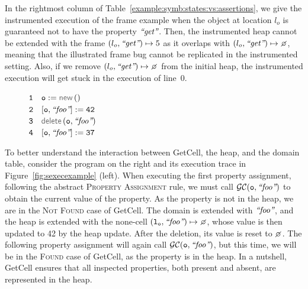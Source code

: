  
 
 In the rightmost column of Table~\ref{example:symb:states:vs:assertions}, we give the instrumented 
 execution of the frame example when
 the object at location $l_o$ is guaranteed not to have the property $\text{{\it ``get''}}$. 
 Then, the  instrumented heap cannot be extended  with 
 the frame $(l_o, \text{{\it ``get''}}) \mapsto 5$ as it overlaps with $(\loc_o, \litstring{get}) \mapsto \none$, meaning 
 that the illustrated frame bug cannot be replicated in the instrumented setting.  
 Also, if we remove $(\loc_o, \litstring{get}) \mapsto \none$ from the initial heap, 
 the instrumented execution will get stuck in the execution of line~$0$. 

\begin{figure}
\vspace*{-0.3cm}
{\footnotesize
\hspace*{-0.5cm} $\mathtt{1\quad o := \jsilnew ()}$ \\[-0.06cm]
\hspace*{-0.5cm} $\mathtt{2\quad [o, \text{{\it ``foo''}}] := 42}$ \\[-0.06cm]
\hspace*{-0.5cm} $\mathtt{3\quad \jsildelete(o, \litstring{foo})}$ \\ [-0.06cm]
\hspace*{-0.5cm} $\mathtt{4\quad [o, \text{{\it ``foo''}}] := 37}$ 
}
\vspace*{-0.4cm}
\end{figure}

To better understand the interaction between GetCell, the heap, and the domain table, consider the 
 program on the right and its execution trace in Figure~\ref{fig:sexecexample} (left). When executing the first property assignment, following the abstract \textsc{Property Assignment} rule, we must call $\mathcal{GC}(\mathtt{o, \text{{\it ``foo''}}})$ to obtain the current value of the property. As the property is not in the heap, we are in the \textsc{Not Found} case of GetCell. The domain is extended with $\text{{\it ``foo''}}$, and the heap is extended with the none-cell $\mathtt{(\loc_o, \litstring{foo})} \mapsto \none$, whose value is then updated to 42 by the heap update. After the deletion, its value is reset to $\none$. The following property assignment will again call $\mathcal{GC}(\mathtt{o, \text{{\it ``foo''}}})$, but this time, we will be in the \textsc{Found} case of GetCell, as the property is in the heap.
In a nutshell, GetCell ensures that all inspected properties, both present and absent, are represented in the heap.

